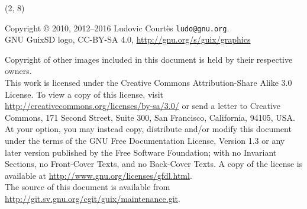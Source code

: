 \documentclass{beamer}
\begin{document}
\begin{frame}{}

  \begin{textblock}{12}(2, 8)
    \tiny{
      Copyright \copyright{} 2010, 2012--2016 Ludovic Courtès \texttt{ludo@gnu.org}.\\[3.0mm]
      GNU GuixSD logo, CC-BY-SA 4.0, \url{http://gnu.org/s/guix/graphics}

      Copyright of other images included in this document is held by
      their respective owners.
      \\[3.0mm]
      This work is licensed under the \alert{Creative Commons
        Attribution-Share Alike 3.0} License.  To view a copy of this
      license, visit
      \url{http://creativecommons.org/licenses/by-sa/3.0/} or send a
      letter to Creative Commons, 171 Second Street, Suite 300, San
      Francisco, California, 94105, USA.
      \\[2.0mm]
      At your option, you may instead copy, distribute and/or modify
      this document under the terms of the \alert{GNU Free Documentation
        License, Version 1.3 or any later version} published by the Free
      Software Foundation; with no Invariant Sections, no Front-Cover
      Texts, and no Back-Cover Texts.  A copy of the license is
      available at \url{http://www.gnu.org/licenses/gfdl.html}.
      \\[2.0mm]
      The source of this document is available from
      \url{http://git.sv.gnu.org/cgit/guix/maintenance.git}.
    }
  \end{textblock}
\end{frame}
\end{document}
